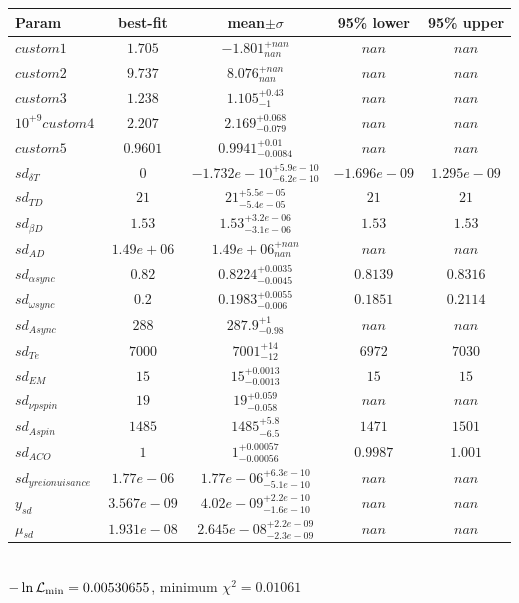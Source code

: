 \begin{tabular}{|l|c|c|c|c|} 
 \hline 
Param & best-fit & mean$\pm\sigma$ & 95\% lower & 95\% upper \\ \hline 
$custom1$ &$1.705$ & $-1.801_{nan}^{+nan}$ & $nan$ & $nan$ \\ 
$custom2$ &$9.737$ & $8.076_{nan}^{+nan}$ & $nan$ & $nan$ \\ 
$custom3$ &$1.238$ & $1.105_{-1}^{+0.43}$ & $nan$ & $nan$ \\ 
$10^{+9}custom4$ &$2.207$ & $2.169_{-0.079}^{+0.068}$ & $nan$ & $nan$ \\ 
$custom5$ &$0.9601$ & $0.9941_{-0.0084}^{+0.01}$ & $nan$ & $nan$ \\ 
$sd_{\delta{} T }$ &$0$ & $-1.732e-10_{-6.2e-10}^{+5.9e-10}$ & $-1.696e-09$ & $1.295e-09$ \\ 
$sd_{T D }$ &$21$ & $21_{-5.4e-05}^{+5.5e-05}$ & $21$ & $21$ \\ 
$sd_{\beta{} D }$ &$1.53$ & $1.53_{-3.1e-06}^{+3.2e-06}$ & $1.53$ & $1.53$ \\ 
$sd_{A D }$ &$1.49e+06$ & $1.49e+06_{nan}^{+nan}$ & $nan$ & $nan$ \\ 
$sd_{\alpha{} sync }$ &$0.82$ & $0.8224_{-0.0045}^{+0.0035}$ & $0.8139$ & $0.8316$ \\ 
$sd_{\omega{} sync }$ &$0.2$ & $0.1983_{-0.006}^{+0.0055}$ & $0.1851$ & $0.2114$ \\ 
$sd_{A sync }$ &$288$ & $287.9_{-0.98}^{+1}$ & $nan$ & $nan$ \\ 
$sd_{T e }$ &$7000$ & $7001_{-12}^{+14}$ & $6972$ & $7030$ \\ 
$sd_{EM }$ &$15$ & $15_{-0.0013}^{+0.0013}$ & $15$ & $15$ \\ 
$sd_{\nu{} p spin }$ &$19$ & $19_{-0.058}^{+0.059}$ & $nan$ & $nan$ \\ 
$sd_{A spin }$ &$1485$ & $1485_{-6.5}^{+5.8}$ & $1471$ & $1501$ \\ 
$sd_{A CO }$ &$1$ & $1_{-0.00056}^{+0.00057}$ & $0.9987$ & $1.001$ \\ 
$sd_{y reio nuisance }$ &$1.77e-06$ & $1.77e-06_{-5.1e-10}^{+6.3e-10}$ & $nan$ & $nan$ \\ 
$y_{sd }$ &$3.567e-09$ & $4.02e-09_{-1.6e-10}^{+2.2e-10}$ & $nan$ & $nan$ \\ 
$\mu{}_{sd }$ &$1.931e-08$ & $2.645e-08_{-2.3e-09}^{+2.2e-09}$ & $nan$ & $nan$ \\ 
\hline 
 \end{tabular} \\ 
$-\ln{\cal L}_\mathrm{min} =0.00530655$, minimum $\chi^2=0.01061$ \\ 
